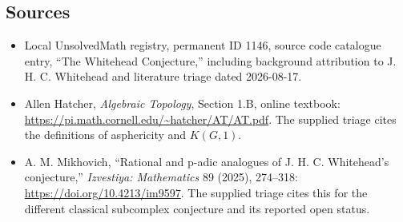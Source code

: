 \documentclass[11pt]{article}
\begin{document}
\subsection{Sources}
\begin{itemize}
\item Local UnsolvedMath registry, permanent ID 1146, source code catalogue entry, ``The Whitehead Conjecture,'' including background attribution to J. H. C. Whitehead and literature triage dated 2026-08-17.
\item Allen Hatcher, \emph{Algebraic Topology}, Section 1.B, online textbook: \url{https://pi.math.cornell.edu/~hatcher/AT/AT.pdf}. The supplied triage cites the definitions of asphericity and \(K(G,1)\).
\item A. M. Mikhovich, ``Rational and p-adic analogues of J. H. C. Whitehead's conjecture,'' \emph{Izvestiya: Mathematics} 89 (2025), 274--318: \url{https://doi.org/10.4213/im9597}. The supplied triage cites this for the different classical subcomplex conjecture and its reported open status.
\end{itemize}
\end{document}

